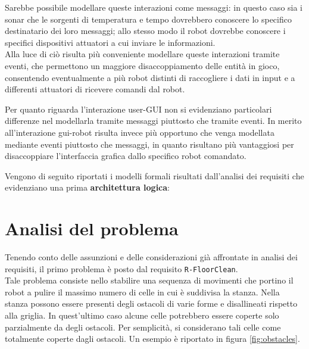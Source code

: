 \documentclass{llncs}
\newcommand{\version}{7}
\newcommand{\code}[1]{{\color{blue}\small{\texttt{#1}}}}
\newcommand{\labelsec}[1]{\label{sec:#1}}
\begin{document}
Sarebbe possibile modellare queste interazioni come messaggi: in questo caso sia i sonar che le sorgenti di temperatura e tempo dovrebbero conoscere lo specifico destinatario dei loro messaggi; allo stesso modo il robot dovrebbe conoscere i specifici dispositivi attuatori a cui inviare le informazioni. \\
Alla luce di ciò risulta più conveniente modellare queste interazioni tramite eventi, che permettono un maggiore disaccoppiamento delle entità in gioco, consentendo eventualmente a più robot distinti di raccogliere i dati in input e a differenti attuatori di ricevere comandi dal robot. 

Per quanto riguarda l'interazione user-GUI non si evidenziano particolari differenze nel modellarla tramite messaggi piuttosto che tramite eventi. 
In merito all'interazione gui-robot risulta invece più opportuno che venga modellata mediante eventi piuttosto che messaggi, in quanto risultano più vantaggiosi per disaccoppiare l'interfaccia grafica dallo specifico robot comandato. 

Vengono di seguito riportati i modelli formali risultati dall'analisi dei requisiti che evidenziano una prima \textbf{architettura logica}:





\section{Analisi del problema}
\labelsec{ProblemAnalysis}

Tenendo conto delle assunzioni e delle considerazioni già affrontate in analisi dei requisiti, il primo problema è posto dal requisito \code{R-FloorClean}. \\ Tale problema consiste nello stabilire una sequenza di movimenti che portino il robot a pulire il massimo numero di celle in cui è suddivisa la stanza. Nella stanza possono essere presenti degli ostacoli di varie forme e disallineati rispetto alla griglia. In quest'ultimo caso alcune celle potrebbero essere coperte solo parzialmente da degli ostacoli. Per semplicità, si considerano tali celle come totalmente coperte dagli ostacoli. Un esempio è riportato in figura \ref{fig:obstacles}.
\end{document}
